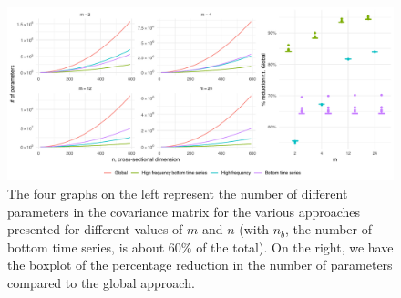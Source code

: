 \documentclass[a4paper,11pt]{article}
\theoremstyle{definition}
\begin{document}
\begin{figure}[!t]
	\centering
	\includegraphics[width = \linewidth]{fig/shr_cov/parameters.pdf}
	\caption{The four graphs on the left represent the number of different parameters in the covariance matrix for the various approaches presented for different values of $m$ and $n$ (with $n_b$, the number of bottom time series, is about $60\%$ of the total). On the right, we have the boxplot of the percentage reduction in the number of parameters compared to the global approach.}
	\label{fig:num_param}
\end{figure}
\end{document}
